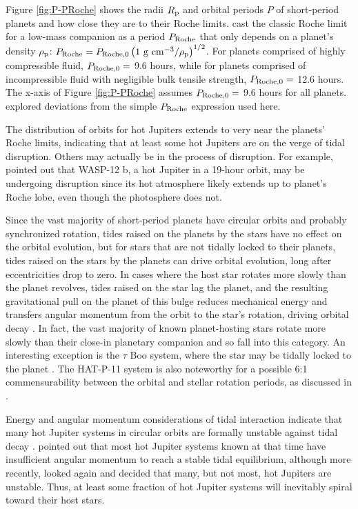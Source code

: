 \documentclass{svjour3}                     %
\begin{document}
Figure \ref{fig:P-PRoche} shows the radii $R_{\rm p}$ and orbital periods $P$ of short-period planets and how close they are to their Roche limits. \cite{Rappaport2013Roche} cast the classic Roche limit for a low-mass companion as a period $P_{\rm Roche}$ that only depends on a planet's density $\rho_{\rm p}$: $P_{\rm Roche} = P_{\rm Roche, 0} \left( 1\ {\rm g\ cm^{-3}} / \rho_{\rm p} \right)^{1/2}$. For planets comprised of highly compressible fluid, $P_{\rm Roche, 0} =$ 9.6 hours, while for planets comprised of incompressible fluid with negligible bulk tensile strength, $P_{\rm Roche, 0} =$ 12.6 hours. The x-axis of Figure \ref{fig:P-PRoche} assumes $P_{\rm Roche, 0} =$ 9.6 hours for all planets. \cite{Rappaport2013Roche} explored deviations from the simple $P_{\rm Roche}$ expression used here. 

The distribution of orbits for hot Jupiters extends to very near the planets' Roche limits, indicating that at least some hot Jupiters are on the verge of tidal disruption. Others may actually be in the process of disruption. For example, \cite{2010Natur.463.1054L} pointed out that WASP-12 b, a hot Jupiter in a 19-hour orbit, may be undergoing disruption since its hot atmosphere likely extends up to planet's Roche lobe, even though the photosphere does not. 

Since the vast majority of short-period planets have circular orbits and probably synchronized rotation, tides raised on the planets by the stars have no effect on the orbital evolution, but for stars that are not tidally locked to their planets, tides raised on the stars by the planets can drive orbital evolution, long after eccentricities drop to zero. In cases where the host star rotates more slowly than the planet revolves, tides raised on the star lag the planet, and the resulting gravitational pull on the planet of this bulge reduces mechanical energy and transfers angular momentum from the orbit to the star's rotation, driving orbital decay \cite{2008CeMDA.101..171F}. In fact, the vast majority of known planet-hosting stars rotate more slowly than their close-in planetary companion and so fall into this category. An interesting exception is the $\tau$ Boo system, where the star may be tidally locked to the planet \cite{2008A&A...482..691W}. The HAT-P-11 system is also noteworthy for a possible 6:1 commensurability between the orbital and stellar rotation periods, as discussed in \cite{2014ApJ...788....1B}.

Energy and angular momentum considerations of tidal interaction indicate that many hot Jupiter systems in circular orbits are formally unstable against tidal decay \cite{1973ApJ...180..307C}. \cite{2009ApJ...692L...9L} pointed out that most hot Jupiter systems known at that time have insufficient angular momentum to reach a stable tidal equilibrium, although more recently, \cite{2015MNRAS.446.3676A} looked again and decided that many, but not most, hot Jupiters are unstable. Thus, at least some fraction of hot Jupiter systems will inevitably spiral toward their host stars. 
\end{document}
